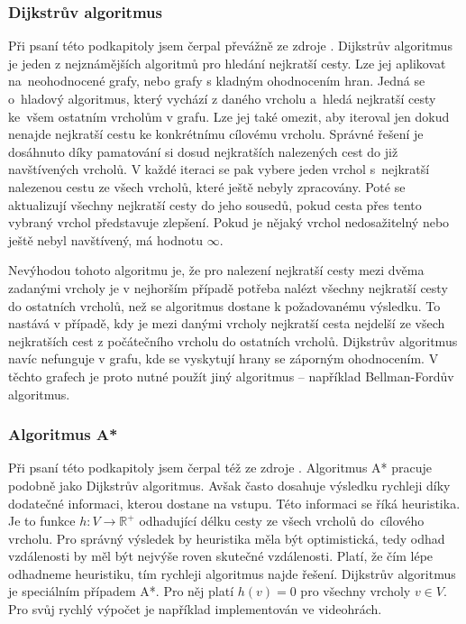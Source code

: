 \documentclass[
  program=infoi,
  biblatex=true,
  figures=true,
  glossaries=false,
  index,
  sourcecodes=true
]{kidiplom}
\begin{document}
\subsubsection{Dijkstrův algoritmus}
Při psaní této podkapitoly jsem čerpal převážně ze zdroje \cite{disk}. Dijkstrův algoritmus\cite{dijkstra-original} je jeden z nejznámějších algoritmů pro hledání nejkratší cesty. Lze jej aplikovat na~neohodnocené grafy, nebo grafy s kladným ohodnocením hran. Jedná se o~hladový algoritmus, který vychází z daného vrcholu a~hledá nejkratší cesty ke~všem ostatním vrcholům v grafu. Lze jej také omezit, aby iteroval jen dokud nenajde nejkratší cestu ke konkrétnímu cílovému vrcholu. Správné řešení je dosáhnuto díky pamatování si dosud nejkratších nalezených cest do již navštívených vrcholů. V každé iteraci se pak vybere jeden vrchol s~nejkratší nalezenou cestu ze všech vrcholů, které ještě nebyly zpracovány. Poté se aktualizují všechny nejkratší cesty do jeho sousedů, pokud cesta přes tento vybraný vrchol představuje zlepšení. Pokud je nějaký vrchol nedosažitelný nebo ještě nebyl navštívený, má hodnotu $\infty$.

Nevýhodou tohoto algoritmu je, že pro nalezení nejkratší cesty mezi dvěma zadanými vrcholy je v nejhorším případě potřeba nalézt všechny nejkratší cesty do ostatních vrcholů, než se algoritmus dostane k požadovanému výsledku. To nastává v případě, kdy je mezi danými vrcholy nejkratší cesta nejdelší ze všech nejkratších cest z počátečního vrcholu do ostatních vrcholů. Dijkstrův algoritmus navíc nefunguje v grafu, kde se vyskytují hrany se záporným ohodnocením. V těchto grafech je proto nutné použít jiný algoritmus -- například Bellman-Fordův\cite{bellman-original} algoritmus.

\subsubsection{Algoritmus A*}
Při psaní této podkapitoly jsem čerpal též ze zdroje \cite{astar}. Algoritmus A*\cite{a*-original} pracuje podobně jako Dijkstrův algoritmus. Avšak často dosahuje výsledku rychleji díky dodatečné informaci, kterou dostane na vstupu. Této informaci se říká heuristika. Je to funkce $h\colon V\to \mathbb{R}^+$ odhadující délku cesty ze všech vrcholů do~cílového vrcholu. Pro správný výsledek by heuristika měla být optimistická, tedy odhad vzdálenosti by měl být nejvýše roven skutečné vzdálenosti. Platí, že čím lépe odhadneme heuristiku, tím rychleji algoritmus najde řešení. Dijkstrův algoritmus je speciálním případem A*. Pro něj platí $h(v)=0$ pro všechny vrcholy $v \in V$. Pro svůj rychlý výpočet je například implementován ve videohrách.
\end{document}
